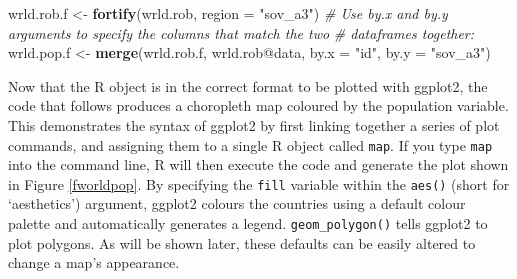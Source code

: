 \documentclass[]{article}
\newenvironment{Shaded}{}{}
\newcommand{\KeywordTok}[1]{\textcolor[rgb]{0.00,0.44,0.13}{\textbf{{#1}}}}
\newcommand{\DataTypeTok}[1]{\textcolor[rgb]{0.56,0.13,0.00}{{#1}}}
\newcommand{\StringTok}[1]{\textcolor[rgb]{0.25,0.44,0.63}{{#1}}}
\newcommand{\CommentTok}[1]{\textcolor[rgb]{0.38,0.63,0.69}{\textit{{#1}}}}
\newcommand{\NormalTok}[1]{{#1}}
\begin{document}
\begin{Shaded}
\begin{Highlighting}[]
\NormalTok{wrld.rob.f <- }\KeywordTok{fortify}\NormalTok{(wrld.rob, }\DataTypeTok{region =} \StringTok{"sov_a3"}\NormalTok{)}
\CommentTok{# Use by.x and by.y arguments to specify the columns that match the two}
\CommentTok{# dataframes together:}
\NormalTok{wrld.pop.f <- }\KeywordTok{merge}\NormalTok{(wrld.rob.f, wrld.rob@data, }\DataTypeTok{by.x =} \StringTok{"id"}\NormalTok{, }\DataTypeTok{by.y =} \StringTok{"sov_a3"}\NormalTok{)}
\end{Highlighting}
\end{Shaded}

Now that the R object is in the correct format to be plotted with ggplot2, the code that follows
 produces a choropleth map coloured by the population variable. This
demonstrates the syntax of ggplot2 by first linking together a series
of plot commands, and assigning them to a single R object called
\texttt{map}. If you type \texttt{map} into the command line, R will
then execute the code and generate the plot shown in Figure \ref{fworldpop}. By specifying the
\texttt{fill} variable within the \texttt{aes()} (short for
`aesthetics') argument, ggplot2 colours the countries using a default
colour palette and automatically generates a legend.
\texttt{geom\_polygon()} tells ggplot2 to plot polygons. As will be
shown later, these defaults can be easily altered to change
a map's appearance.
\end{document}
